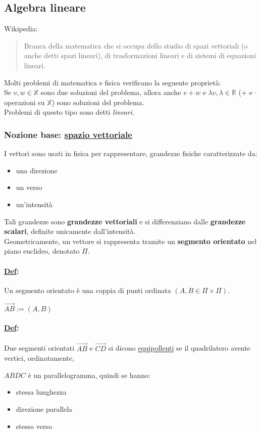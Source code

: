\documentclass{article}
\newcommand{\ul}[1]{\underline{#1}}
\newcommand{\R}{\mathbb{R}}
\newcommand{\Def}[2]{\paragraph{\ul{Def}:}#1\\\hspace*{3em}\begin{minipage}{.8\textwidth}#2\end{minipage}}
\begin{document}
\subsection{Algebra lineare}
Wikipedia:
\begin{quotation}
	Branca della matematica che si occupa dello studio di spazi vettoriali (o anche detti spazi lineari), di trasformazioni lineari e di sistemi di equazioni lineari.
\end{quotation}
Molti problemi di matematica e fisica verificano la seguente proprietà:\\
Se $v,w\in\mathbb{X}$ sono due soluzioni del problema, allora anche $v+w$ e $\lambda v,\lambda\in\R$  ($+$ e $\cdot$ operazioni su $\mathbb{X}$) sono soluzioni del problema.\\
Problemi di questo tipo sono detti \textit{lineari}.

\subsubsection*{Nozione base: \ul{spazio vettoriale}}

I vettori sono usati in fisica per rappresentare, grandezze fisiche caratterizzate da:
\begin{itemize}
	\item una direzione
	\item un verso
	\item un'intensità
\end{itemize}
Tali grandezze sono \textbf{grandezze vettoriali} e si differenziano dalle \textbf{grandezze scalari}, definite unicamente dall'intensità.\\
Geometricamente, un vettore si rappresenta tramite un \textbf{segmento orientato} nel piano euclideo, denotato $\Pi$.
\Def{Un segmento orientato è una coppia di punti ordinata $(A,B\in\Pi\times\Pi)$.}{$\vec{AB}:=(A,B)$}
\Def{Due segmenti orientati $\vec{AB}$ e $\vec{CD}$ si dicono \ul{equipollenti} se il quadrilatero avente vertici, ordinatamente,}{$ABDC$ è un parallelogramma, quindi se hanno:
	\begin{itemize}
		\item stessa lunghezza
		\item direzione parallela
		\item stesso verso
	\end{itemize}}
\end{document}
